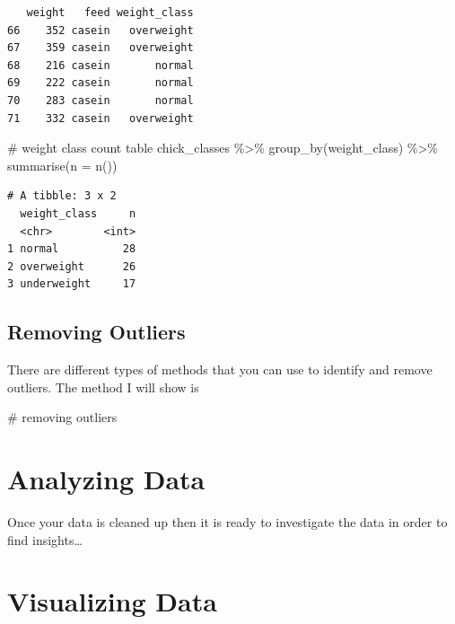 \documentclass[
  letterpaper,
  DIV=11,
  numbers=noendperiod]{scrreprt}
\newenvironment{Shaded}{\begin{snugshade}}{\end{snugshade}}
\newcommand{\AttributeTok}[1]{\textcolor[rgb]{0.40,0.45,0.13}{#1}}
\newcommand{\CommentTok}[1]{\textcolor[rgb]{0.37,0.37,0.37}{#1}}
\newcommand{\FunctionTok}[1]{\textcolor[rgb]{0.28,0.35,0.67}{#1}}
\newcommand{\NormalTok}[1]{\textcolor[rgb]{0.00,0.23,0.31}{#1}}
\newcommand{\SpecialCharTok}[1]{\textcolor[rgb]{0.37,0.37,0.37}{#1}}
\begin{document}
\begin{verbatim}
   weight   feed weight_class
66    352 casein   overweight
67    359 casein   overweight
68    216 casein       normal
69    222 casein       normal
70    283 casein       normal
71    332 casein   overweight
\end{verbatim}

\begin{Shaded}
\begin{Highlighting}[]
\CommentTok{\# weight class count table }
\NormalTok{chick\_classes }\SpecialCharTok{\%\textgreater{}\%} 
  \FunctionTok{group\_by}\NormalTok{(weight\_class) }\SpecialCharTok{\%\textgreater{}\%}
  \FunctionTok{summarise}\NormalTok{(}\AttributeTok{n =} \FunctionTok{n}\NormalTok{())}
\end{Highlighting}
\end{Shaded}

\begin{verbatim}
# A tibble: 3 x 2
  weight_class     n
  <chr>        <int>
1 normal          28
2 overweight      26
3 underweight     17
\end{verbatim}

\hypertarget{removing-outliers}{%
\section{Removing Outliers}\label{removing-outliers}}

There are different types of methods that you can use to identify and
remove outliers. The method I will show is

\begin{Shaded}
\begin{Highlighting}[]
\CommentTok{\# removing outliers}
\end{Highlighting}
\end{Shaded}


\hypertarget{analyzing-data}{%
\chapter{Analyzing Data}\label{analyzing-data}}

Once your data is cleaned up then it is ready to investigate the data in
order to find insights\ldots{}


\hypertarget{visualizing-data}{%
\chapter{Visualizing Data}\label{visualizing-data}}
\end{document}
